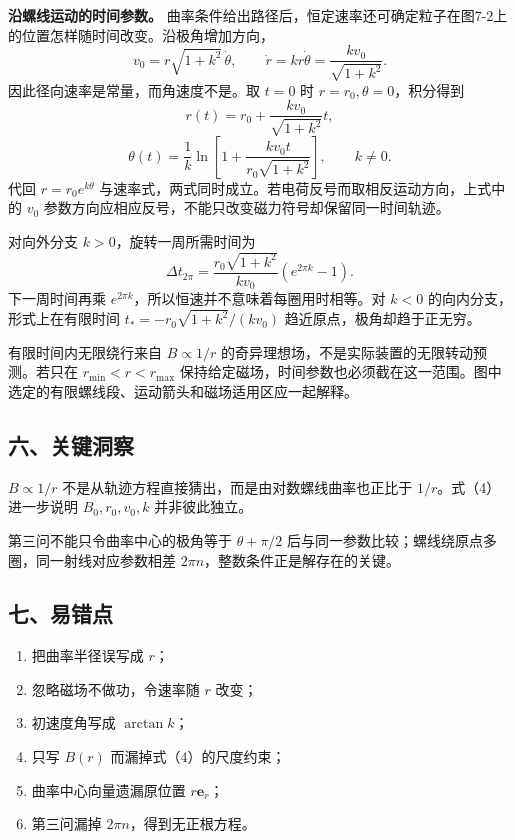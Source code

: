 \documentclass[12pt,a4paper,UTF8]{ctexart}
\newcommand{\tightlist}{\setlength{\itemsep}{0pt}\setlength{\parskip}{0pt}}
\begin{document}
\textbf{沿螺线运动的时间参数。}
曲率条件给出路径后，恒定速率还可确定粒子在图7-2上的位置怎样随时间改变。沿极角增加方向，
\[
v_0=r\sqrt{1+k^2}\,\dot\theta,
\qquad \dot r=kr\dot\theta
=\frac{kv_0}{\sqrt{1+k^2}}.
\] 因此径向速率是常量，而角速度不是。取 \(t=0\) 时
\(r=r_0,\theta=0\)，积分得到 \[
r(t)=r_0+\frac{kv_0}{\sqrt{1+k^2}}t,
\] \[
\theta(t)=\frac1k\ln\left[1+
\frac{kv_0t}{r_0\sqrt{1+k^2}}\right],\qquad k\ne0.
\] 代回 \(r=r_0e^{k\theta}\)
与速率式，两式同时成立。若电荷反号而取相反运动方向，上式中的 \(v_0\)
参数方向应相应反号，不能只改变磁力符号却保留同一时间轨迹。

对向外分支 \(k>0\)，旋转一周所需时间为 \[
\Delta t_{2\pi}=\frac{r_0\sqrt{1+k^2}}{kv_0}(e^{2\pi k}-1).
\] 下一周时间再乘 \(e^{2\pi k}\)，所以恒速并不意味着每圈用时相等。对
\(k<0\) 的向内分支，形式上在有限时间 \(t_*=-r_0\sqrt{1+k^2}/(kv_0)\)
趋近原点，极角却趋于正无穷。

有限时间内无限绕行来自 \(B\propto1/r\)
的奇异理想场，不是实际装置的无限转动预测。若只在 \(r_{\min}<r<r_{\max}\)
保持给定磁场，时间参数也必须截在这一范围。图中选定的有限螺线段、运动箭头和磁场适用区应一起解释。

\subsection{六、关键洞察}\label{ux516dux5173ux952eux6d1eux5bdf-6}

\(B\propto1/r\) 不是从轨迹方程直接猜出，而是由对数螺线曲率也正比于
\(1/r\)。式（4）进一步说明 \(B_0,r_0,v_0,k\) 并非彼此独立。

第三问不能只令曲率中心的极角等于 \(\theta+\pi/2\)
后与同一参数比较；螺线绕原点多圈，同一射线对应参数相差
\(2\pi n\)，整数条件正是解存在的关键。

\subsection{七、易错点}\label{ux4e03ux6613ux9519ux70b9-6}

\begin{enumerate}
\def\labelenumi{\arabic{enumi}.}
\tightlist
\item
  把曲率半径误写成 \(r\)；
\item
  忽略磁场不做功，令速率随 \(r\) 改变；
\item
  初速度角写成 \(\arctan k\)；
\item
  只写 \(B(r)\) 而漏掉式（4）的尺度约束；
\item
  曲率中心向量遗漏原位置 \(r\bm e_r\)；
\item
  第三问漏掉 \(2\pi n\)，得到无正根方程。
\end{enumerate}
\end{document}
